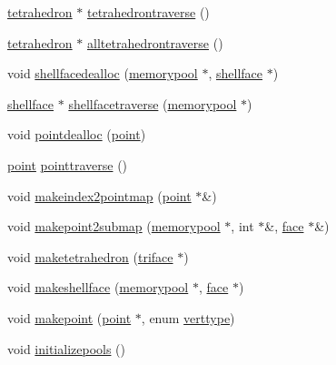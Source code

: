 \begin{DoxyCompactItemize}
\hyperlink{classtetgenmesh_a6a12b1c0d1834ca941d16c62e949e5e3}{tetrahedron} $\ast$ \hyperlink{classtetgenmesh_a11da430cc44475b41fdbfc80de511192}{tetrahedrontraverse} ()
\item 
\hyperlink{classtetgenmesh_a6a12b1c0d1834ca941d16c62e949e5e3}{tetrahedron} $\ast$ \hyperlink{classtetgenmesh_afacb84170cf526490d58e2e5a633d6e8}{alltetrahedrontraverse} ()
\item 
void \hyperlink{classtetgenmesh_ab368f639981dcf465b5e8654942bcc69}{shellfacedealloc} (\hyperlink{classtetgenmesh_1_1memorypool}{memorypool} $\ast$, \hyperlink{classtetgenmesh_ad4860123b88783b943fa6452e886a2cb}{shellface} $\ast$)
\item 
\hyperlink{classtetgenmesh_ad4860123b88783b943fa6452e886a2cb}{shellface} $\ast$ \hyperlink{classtetgenmesh_ae50ecae1d69935b12a4fa7ca843011d7}{shellfacetraverse} (\hyperlink{classtetgenmesh_1_1memorypool}{memorypool} $\ast$)
\item 
void \hyperlink{classtetgenmesh_abafc92933f5d33791abeca5eb0a7cc05}{pointdealloc} (\hyperlink{classtetgenmesh_ace3fb4f80389185b7c9b18ab69a3dea2}{point})
\item 
\hyperlink{classtetgenmesh_ace3fb4f80389185b7c9b18ab69a3dea2}{point} \hyperlink{classtetgenmesh_a2b088cf9fa743d47b4520d43d9964087}{pointtraverse} ()
\item 
void \hyperlink{classtetgenmesh_a0a278dbd160df620cfe93fd3eed5e9da}{makeindex2pointmap} (\hyperlink{classtetgenmesh_ace3fb4f80389185b7c9b18ab69a3dea2}{point} $\ast$\&)
\item 
void \hyperlink{classtetgenmesh_a20c595345b290a1d08c29e4d3a0e0500}{makepoint2submap} (\hyperlink{classtetgenmesh_1_1memorypool}{memorypool} $\ast$, int $\ast$\&, \hyperlink{classtetgenmesh_1_1face}{face} $\ast$\&)
\item 
void \hyperlink{classtetgenmesh_aa1a1561e6fde22070832ae038976067b}{maketetrahedron} (\hyperlink{classtetgenmesh_1_1triface}{triface} $\ast$)
\item 
void \hyperlink{classtetgenmesh_a98c862e8bb1f1c25e03bb550804028cd}{makeshellface} (\hyperlink{classtetgenmesh_1_1memorypool}{memorypool} $\ast$, \hyperlink{classtetgenmesh_1_1face}{face} $\ast$)
\item 
void \hyperlink{classtetgenmesh_ac6115b981e63664fe06c4a1d4b541737}{makepoint} (\hyperlink{classtetgenmesh_ace3fb4f80389185b7c9b18ab69a3dea2}{point} $\ast$, enum \hyperlink{classtetgenmesh_ad0458f823a5eef2de89c7fae067aa2ac}{verttype})
\item 
void \hyperlink{classtetgenmesh_a0ed29d97e57db7035017c312dc6aaa2f}{initializepools} ()

\end{DoxyCompactItemize}
